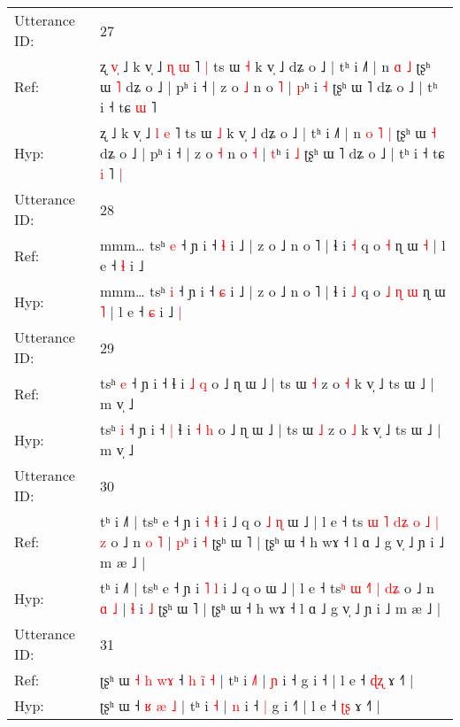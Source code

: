 \documentclass[10pt]{article}
\DeclareRobustCommand{\hl}[1]{{\textcolor{red}{#1}}}
\begin{document}
\begin{longtable}{ll}
 \\
\midrule
Utterance ID: & 27 \\
Ref: & ʐ\hl{ }\hl{v}\hl{̩} ˩ k v̩ ˩ \hl{ɳ} \hl{ɯ} ˥\hl{ }\hl{|} ts ɯ \hl{˧} k v̩ ˩ dʑ o ˩ | tʰ i ˩˥ | n\hl{}\hl{} \hl{ɑ} \hl{˩} ʈʂʰ ɯ \hl{˥} dʑ o ˩ | pʰ i ˧ | z o \hl{˩} n o \hl{˥} | \hl{p}ʰ i \hl{˧} ʈʂʰ ɯ ˥ dʑ o ˩ | tʰ i ˧ tɕ \hl{ɯ} ˥\hl{}\hl{}
 \\
Hyp: & ʐ\hl{}\hl{}\hl{} ˩ k v̩ ˩ \hl{l} \hl{e} ˥\hl{}\hl{} ts ɯ \hl{˩} k v̩ ˩ dʑ o ˩ | tʰ i ˩˥ | n\hl{ }\hl{o} \hl{˥} \hl{|} ʈʂʰ ɯ \hl{˧} dʑ o ˩ | pʰ i ˧ | z o \hl{˧} n o \hl{˧} | \hl{t}ʰ i \hl{˩} ʈʂʰ ɯ ˥ dʑ o ˩ | tʰ i ˧ tɕ \hl{i} ˥\hl{ }\hl{|}
 \\
\midrule
Utterance ID: & 28 \\
Ref: & mmm… tsʰ \hl{e} ˧ ɲ i ˧ \hl{ɬ} i ˩ | z o ˩ n o ˥ | ɬ i \hl{˧} q o\hl{}\hl{}\hl{}\hl{} \hl{˧} ɳ ɯ \hl{˧} | l e ˧ \hl{ɬ} i ˩\hl{}\hl{}
 \\
Hyp: & mmm… tsʰ \hl{i} ˧ ɲ i ˧ \hl{ɕ} i ˩ | z o ˩ n o ˥ | ɬ i \hl{˩} q o\hl{ }\hl{˩}\hl{ }\hl{ɳ} \hl{ɯ} ɳ ɯ \hl{˥} | l e ˧ \hl{ɕ} i ˩\hl{ }\hl{|}
 \\
\midrule
Utterance ID: & 29 \\
Ref: & tsʰ \hl{e} ˧ ɲ i ˧\hl{}\hl{} ɬ i \hl{˩} \hl{q} o ˩ ɳ ɯ ˩ | ts ɯ \hl{˧} z o \hl{˧} k v̩ ˩ ts ɯ ˩ | m v̩ ˩
 \\
Hyp: & tsʰ \hl{i} ˧ ɲ i ˧\hl{ }\hl{|} ɬ i \hl{˧} \hl{h} o ˩ ɳ ɯ ˩ | ts ɯ \hl{˩} z o \hl{˩} k v̩ ˩ ts ɯ ˩ | m v̩ ˩
 \\
\midrule
Utterance ID: & 30 \\
Ref: & tʰ i ˩˥ | tsʰ e ˧ ɲ i \hl{˧} \hl{ɬ} i ˩ q o\hl{ }\hl{˩}\hl{ }\hl{ɳ} ɯ ˩ | l e ˧ ts\hl{ }\hl{ɯ} \hl{˥} \hl{d}\hl{ʑ}\hl{ }\hl{o} \hl{˩} \hl{|}\hl{ }\hl{z} o ˩ n \hl{o} \hl{˥} | \hl{p}\hl{ʰ} i \hl{˧} ʈʂʰ ɯ ˥ | ʈʂʰ ɯ ˧ h wɤ ˧ l ɑ ˩ g v̩ ˩ ɲ i ˩ m æ ˩ |
 \\
Hyp: & tʰ i ˩˥ | tsʰ e ˧ ɲ i \hl{˥} \hl{l} i ˩ q o\hl{}\hl{}\hl{}\hl{} ɯ ˩ | l e ˧ ts\hl{}\hl{ʰ} \hl{ɯ} \hl{}\hl{}\hl{˧}\hl{˥} \hl{|} \hl{}\hl{d}\hl{ʑ} o ˩ n \hl{ɑ} \hl{˩} | \hl{}\hl{ɬ} i \hl{˩} ʈʂʰ ɯ ˥ | ʈʂʰ ɯ ˧ h wɤ ˧ l ɑ ˩ g v̩ ˩ ɲ i ˩ m æ ˩ |
 \\
\midrule
Utterance ID: & 31 \\
Ref: & ʈʂʰ ɯ\hl{ }\hl{˧}\hl{ }\hl{h}\hl{ }\hl{w}\hl{ɤ} ˧ \hl{h} \hl{i}\hl{̃} \hl{˧} | tʰ i \hl{˩}\hl{˥} | \hl{ɲ} i ˧\hl{}\hl{} g i ˧\hl{} | l e ˧ \hl{ɖ}\hl{ʐ} ɤ ˧˥ |
 \\
Hyp: & ʈʂʰ ɯ\hl{}\hl{}\hl{}\hl{}\hl{}\hl{}\hl{} ˧ \hl{ʁ} \hl{}\hl{æ} \hl{˩} | tʰ i \hl{}\hl{˧} | \hl{n} i ˧\hl{ }\hl{|} g i ˧\hl{˥} | l e ˧ \hl{ʈ}\hl{ʂ} ɤ ˧˥ |

\end{longtable}
\end{document}

